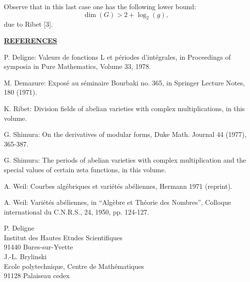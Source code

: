 \documentclass[10pt,a4paper]{article}
\newenvironment{refitems}{\begin{list}{}{\setlength{\leftmargin}{3.2em}\setlength{\labelwidth}{2.7em}\setlength{\labelsep}{0.5em}\setlength{\itemsep}{0.55em}\setlength{\parsep}{0pt}\setlength{\topsep}{0.2em}}}{\end{list}}
\begin{document}
Observe that in this last case one has the following lower bound:
\[
\dim(G)>2+\log_2(g),
\]
due to Ribet [3].


\newpage


\noindent\uline{\textbf{REFERENCES}}

\begin{refitems}
\item[{[1]}] P. Deligne: Valeurs de fonctions L et périodes d'intégrales, in Proceedings of symposia in Pure Mathematics, Volume 33, 1978.
\item[{[2]}] M. Demazure: Exposé au séminaire Bourbaki no. 365, in Springer Lecture Notes, 180 (1971).
\item[{[3]}] K. Ribet: Division fields of abelian varieties with complex multiplications, in this volume.
\item[{[4]}] G. Shimura: On the derivatives of modular forms, Duke Math. Journal 44 (1977), 365-387.
\item[{[5]}] G. Shimura: The periods of abelian varieties with complex multiplication and the special values of certain zeta functions, in this volume.
\item[{[6]}] A. Weil: Courbes algébriques et variétés abéliennes, Hermann 1971 (reprint).
\item[{[7]}] A. Weil: Variétés abéliennes, in ``Algèbre et Théorie des Nombres'', Colloque international du C.N.R.S., 24, 1950, pp. 124-127.
\end{refitems}

\vspace{2em}
\begin{flushright}
\begin{minipage}{0.48\textwidth}
P. Deligne\\
Institut des Hautes Etudes Scientifiques\\
91440 Bures-sur-Yvette\\[0.6em]
J.-L. Brylinski\\
Ecole polytechnique, Centre de Mathématiques\\
91128 Palaiseau cedex
\end{minipage}
\end{flushright}

\vfill

\end{document}
